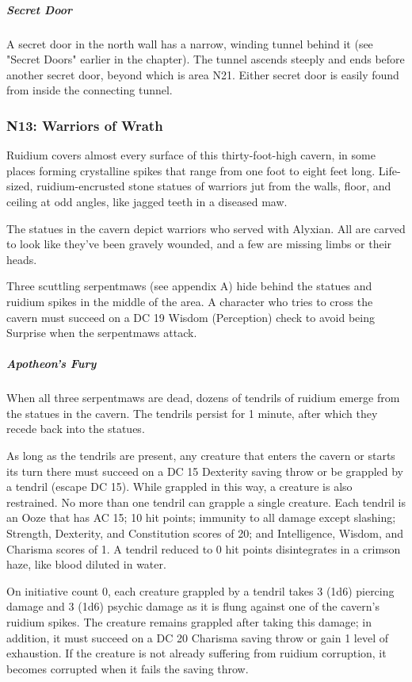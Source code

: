 \documentclass[10pt,a4paper,twoside,bg=print,twocolumn,openany,nodeprecatedcode]{dndbook}
\begin{document}
\subparagraph{Secret Door}
A secret door in the north wall has a narrow, winding tunnel behind it (see "Secret Doors" earlier in the chapter). The tunnel ascends steeply and ends before another secret door, beyond which is area N21. Either secret door is easily found from inside the connecting tunnel.

\subsubsection{N13: Warriors of Wrath}
\begin{DndReadAloud}{}
Ruidium covers almost every surface of this thirty-foot-high cavern, in some places forming crystalline spikes that range from one foot to eight feet long. Life-sized, ruidium-encrusted stone statues of warriors jut from the walls, floor, and ceiling at odd angles, like jagged teeth in a diseased maw.

\end{DndReadAloud}

The statues in the cavern depict warriors who served with Alyxian. All are carved to look like they've been gravely wounded, and a few are missing limbs or their heads.

Three scuttling serpentmaws (see appendix A) hide behind the statues and ruidium spikes in the middle of the area. A character who tries to cross the cavern must succeed on a DC 19 Wisdom (Perception) check to avoid being Surprise when the serpentmaws attack.

\subparagraph{Apotheon's Fury}
When all three serpentmaws are dead, dozens of tendrils of ruidium emerge from the statues in the cavern. The tendrils persist for 1 minute, after which they recede back into the statues.

As long as the tendrils are present, any creature that enters the cavern or starts its turn there must succeed on a DC 15 Dexterity saving throw or be grappled by a tendril (escape DC 15). While grappled in this way, a creature is also restrained. No more than one tendril can grapple a single creature. Each tendril is an Ooze that has AC 15; 10 hit points; immunity to all damage except slashing; Strength, Dexterity, and Constitution scores of 20; and Intelligence, Wisdom, and Charisma scores of 1. A tendril reduced to 0 hit points disintegrates in a crimson haze, like blood diluted in water.

On initiative count 0, each creature grappled by a tendril takes 3 (1d6) piercing damage and 3 (1d6) psychic damage as it is flung against one of the cavern's ruidium spikes. The creature remains grappled after taking this damage; in addition, it must succeed on a DC 20 Charisma saving throw or gain 1 level of exhaustion. If the creature is not already suffering from ruidium corruption, it becomes corrupted when it fails the saving throw.
\end{document}
